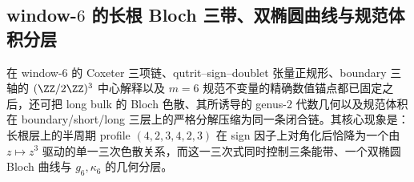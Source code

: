 \subsection{window-\texorpdfstring{$6$}{6} 的长根 Bloch 三带、双椭圆曲线与规范体积分层}\label{subsec:conclusion-window6-long-bloch-bielliptic-gauge-stratification}
在 window-\(6\) 的 Coxeter 三项链、qutrit--sign--doublet 张量正规形、boundary 三轴的 \((\ZZ/2\ZZ)^3\) 中心解释以及 \(m=6\) 规范不变量的精确数值锚点都已固定之后，还可把 long bulk 的 Bloch 色散、其所诱导的 genus-\(2\) 代数几何以及规范体积在 boundary/short/long 三层上的严格分解压缩为同一条闭合链。其核心现象是：长根层上的半周期 profile \((4,2,3,4,2,3)\) 在 sign 因子上对角化后恰降为一个由 \(z\mapsto z^3\) 驱动的单一三次色散关系，而这一三次式同时控制三条能带、一个双椭圆 Bloch 曲线与 \(g_6,\kappa_6\) 的几何分层。

